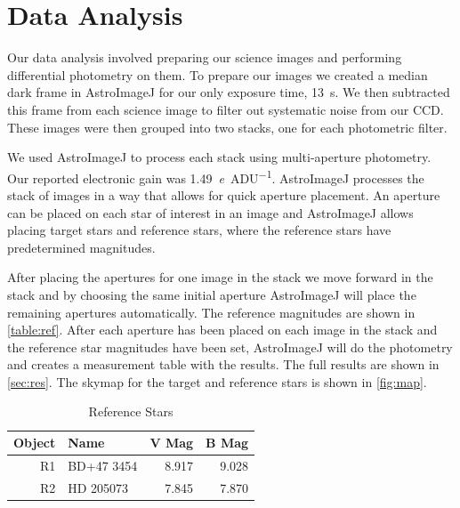\documentclass[%
aip,
jmp,
reprint,
floatfix
]{revtex4-1}
\begin{document}

	\section{Data Analysis}
	Our data analysis involved preparing our science images and performing differential photometry on them. To prepare our images we created a median dark frame in AstroImageJ for our only exposure time, \SI{13}{\second}. We then subtracted this frame from each science image to filter out systematic noise from our CCD. These images were then grouped into two stacks, one for each photometric filter.
	
	We used AstroImageJ to process each stack using multi-aperture photometry. Our reported electronic gain was \SI{1.49}{\elementarycharge\per{ADU}}. AstroImageJ processes the stack of images in a way that allows for quick aperture placement. An aperture can be placed on each star of interest in an image and AstroImageJ allows placing target stars and reference stars, where the reference stars have predetermined magnitudes.
	
	After placing the apertures for one image in the stack we move forward in the stack and by choosing the same initial aperture AstroImageJ will place the remaining apertures automatically. The reference magnitudes are shown in \autoref{table:ref}. After each aperture has been placed on each image in the stack and the reference star magnitudes have been set, AstroImageJ will do the photometry and creates a measurement table with the results. The full results are shown in \autoref{sec:res}. The skymap for the target and reference stars is shown in \autoref{fig:map}.

	\begin{table}[ht]
		\centering
		\caption{Reference Stars}
		\begin{tabular*}{0.7\linewidth}{@{\extracolsep{\fill}}rlrr}
			\hline
			Object & Name       &        V Mag &        B Mag \\ \hline\hline
			    R1 & BD+47 3454 & \SI{8.917}{} & \SI{9.028}{} \\
			    R2 & HD 205073  & \SI{7.845}{} & \SI{7.870}{} \\ \hline
		\end{tabular*}
		\label{table:ref}
	\end{table}
\end{document}
